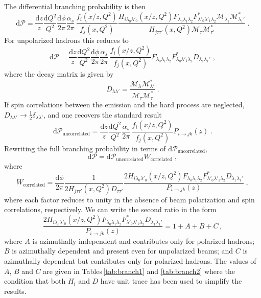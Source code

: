 \documentclass[a4paper,11pt]{article}
\begin{document}
The differential branching probability is then
\begin{equation}
  \mathrm{d}\mathcal{P} = \frac{\mathrm{d}z}z \frac{\mathrm{d}Q^2}{Q^2} \frac{\mathrm{d}\phi}{2\pi}\frac{\alpha_s}{2\pi}\,
  \frac{f_i\left(x/z,Q^2\right) }{ f_j(x,Q^2) }
  \frac{H_{i\lambda_0\lambda'_0}\left(x/z,Q^2\right) F_{\lambda_0\lambda_1\lambda_2} F^*_{\lambda'_0\lambda'_1\lambda_2} \mathcal{M}_{\lambda_1}\mathcal{M}^*_{\lambda_1'}}{H_{j\tau\tau'}(x,Q^2) \mathcal{M}_\tau\mathcal{M}^*_{\tau'}}\;.
\end{equation}
For unpolarized hadrons this reduces to
\begin{equation}
  \mathrm{d}\mathcal{P} = \frac{\mathrm{d}z}z \frac{\mathrm{d}Q^2}{Q^2} \frac{\mathrm{d}\phi}{2\pi}\frac{\alpha_s}{2\pi}\,
  \frac{f_i\left(x/z,Q^2\right) }{ f_j(x,Q^2) }
  F_{\lambda_0\lambda_1\lambda_2} F^*_{\lambda_0\lambda'_1\lambda_2} D_{\lambda_1\lambda_1'}\;,
\end{equation}
where the decay matrix is given by
\begin{equation}
  D_{\lambda\lambda'} = \frac{\mathcal{M}_{\lambda}\mathcal{M}^*_{\lambda'}}{\mathcal{M}_\tau\mathcal{M}^*_{\tau}}\;.
\end{equation}
If spin correlations between the emission and the hard process are neglected, $D_{\lambda\lambda'}\to \frac12\delta_{\lambda\lambda'}$,
and one recovers the standard result
\begin{equation} 
  \mathrm{d}\mathcal{P}_\mathrm{uncorrelated} = \frac{\mathrm{d}z}z \frac{\mathrm{d}Q^2}{Q^2} \frac{\alpha_s}{2\pi}\,
  \frac{f_i\left(x/z,Q^2\right) }{ f_j(x,Q^2) } P_{i\to jk}(z)\;.
\end{equation}
Rewriting the full branching probability in terms of $\mathrm{d}\mathcal{P}_\mathrm{uncorrelated}$,
\begin{equation}
  \mathrm{d}\mathcal{P} = \mathrm{d}\mathcal{P}_\mathrm{uncorrelated} W_\mathrm{correlated}\;,
\end{equation}
where
\begin{equation}
  W_\mathrm{correlated} =
  \frac{\mathrm{d}\phi}{2\pi}\frac1{2H_{j\tau\tau'}(x,Q^2) D_{\tau\tau'}}
  \frac{2H_{i\lambda_0\lambda'_0}\left(x/z,Q^2\right) F_{\lambda_0\lambda_1\lambda_2} F^*_{\lambda'_0\lambda'_1\lambda_2}D_{\lambda_1\lambda_1'}}{P_{i\to jk}(z)}\;,
\end{equation}
where each factor reduces to unity in the absence of beam polarization and spin correlations, respectively.
We can write the second ratio in the form
\begin{equation}
   \frac{2H_{i\lambda_0\lambda'_0}\left(x/z,Q^2\right) F_{\lambda_0\lambda_1\lambda_2} F^*_{\lambda'_0\lambda'_1\lambda_2}D_{\lambda_1\lambda_1'}}{P_{i\to jk}(z)} = 1 + A + B + C\,,\label{eqn:corr}
\end{equation}
where $A$ is azimuthally independent and contributes only for polarized hadrons; $B$ is azimuthally dependent and present even for unpolarized beams; and $C$ is azimuthally dependent but contributes only for polarized hadrons.
The values of $A$, $B$ and $C$ are given in Tables\,\ref{tab:branch1} and \ref{tab:branch2} where the condition that both $H_i$ and $D$ have unit trace
has been used to simplify the results.
\end{document}
